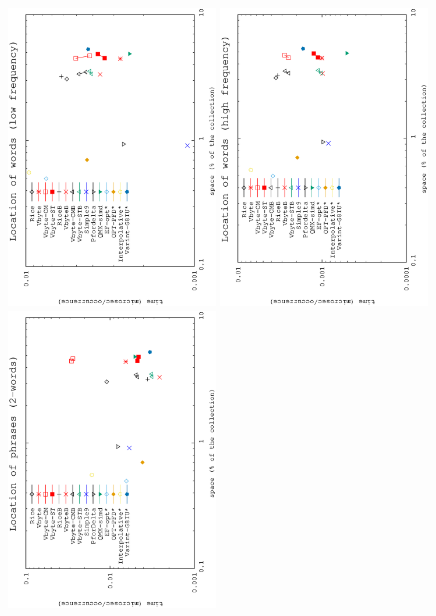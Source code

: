 \documentclass[review]{elsarticle}
\begin{document}
\begin{figure}[t]
\begin{center}
\includegraphics[angle=-90,width=0.49\textwidth]{../figures/f1/words1-1000/nonpos-Wa.eps}
\includegraphics[angle=-90,width=0.49\textwidth]{../figures/f1/words1001-100k/nonpos-Wb.eps}
\includegraphics[angle=-90,width=0.49\textwidth]{../figures/f1/phrases2-2/nopos-2_2.eps}

\end{center}
\end{figure}
\end{document}
